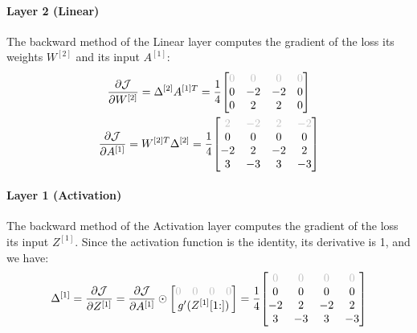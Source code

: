 \paragraph{Layer 2 (Linear)} The backward method of the Linear layer computes the gradient of the loss \wrt its weights $W^{[2]}$ and its input $A^{[1]}$:
\begin{gather*}
    \pdv{\J}{W^{[2]}} = \Delta^{[2]} A^{[1]T} = \frac{1}{4} \mqty[
        \color{lightgray} 0 & \color{lightgray} 0 & \color{lightgray} 0 & \color{lightgray} 0 \\
        0 & -2 & -2 & 0 \\
        0 & 2 & 2 & 0 \\
    ]\\
    \pdv{\J}{A^{[1]}} = W^{[2]T} \Delta^{[2]} = \frac{1}{4} \mqty[
        \color{lightgray} 2 & \color{lightgray} -2 & \color{lightgray} 2 & \color{lightgray} -2 \\
        0 & 0 & 0 & 0 \\
        -2 & 2 & -2 & 2 \\
        3 & -3 & 3 & -3 \\
    ]
\end{gather*}

\paragraph{Layer 1 (Activation)} The backward method of the Activation layer computes the gradient of the loss \wrt its input $Z^{[1]}$. Since the activation function is the identity, its derivative is 1, and we have:
\begin{equation*}
    \Delta^{[1]} = \pdv{\J}{Z^{[1]}} = \pdv{\J}{A^{[1]}} \odot \mqty[
        \mqty{\color{lightgray} 0 & \color{lightgray} 0 & \color{lightgray} 0 & \color{lightgray} 0} \\
        g'(Z^{[1]}[1\hspace{-0.6ex}:])
    ] = \frac{1}{4} \mqty[
        \color{lightgray} 0 & \color{lightgray} 0 & \color{lightgray} 0 & \color{lightgray} 0 \\
        0 & 0 & 0 & 0 \\
        -2 & 2 & -2 & 2 \\
        3 & -3 & 3 & -3 \\
    ]
\end{equation*}

